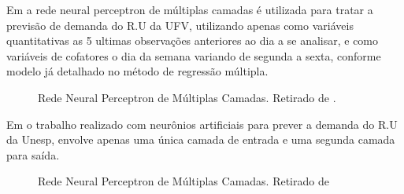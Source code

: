 \documentclass[	12pt, Times, openright, twoside, a4paper, english, brazil]{abntex2}
\begin{document}
  	       Em \cite{Lopes2008} a rede neural perceptron de múltiplas camadas é utilizada para tratar a previsão de demanda do R.U da UFV, utilizando apenas como variáveis quantitativas as 5 ultimas observações anteriores ao dia a se analisar, e como variáveis de cofatores o dia da semana variando de segunda a sexta, conforme modelo já detalhado no método de regressão múltipla.
          \begin{figure}[!ht]
          	\caption{Rede Neural Perceptron de Múltiplas Camadas. Retirado de \cite{Lopes2008}.\label{fig:Rna-Perceptron-MultiLayer}}
          \end{figure}

          Em \cite{Rocha2011} o trabalho realizado com neurônios artificiais para prever a demanda do R.U da Unesp, envolve apenas uma única camada de entrada e uma segunda camada para saída. 
          \begin{figure}[!ht]
          	\caption{Rede Neural Perceptron de Múltiplas Camadas. Retirado de  \cite{Rocha2011} \label{fig:rnaRocha}}
          \end{figure}
         
\end{document}
